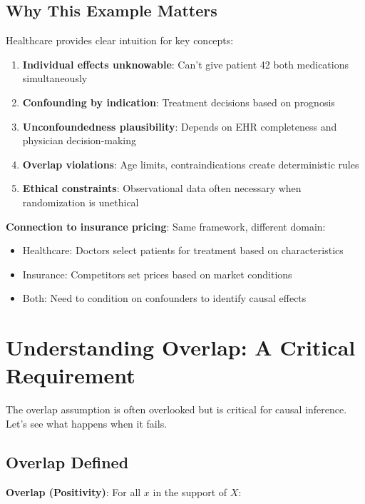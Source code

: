 \subsection{Why This Example Matters}\label{_why_this_example_matters}

Healthcare provides clear intuition for key concepts:

\begin{enumerate}
\def\labelenumi{\arabic{enumi}.}
\item
  \textbf{Individual effects unknowable}: Can't give patient 42 both
  medications simultaneously
\item
  \textbf{Confounding by indication}: Treatment decisions based on
  prognosis
\item
  \textbf{Unconfoundedness plausibility}: Depends on EHR completeness
  and physician decision-making
\item
  \textbf{Overlap violations}: Age limits, contraindications create
  deterministic rules
\item
  \textbf{Ethical constraints}: Observational data often necessary when
  randomization is unethical
\end{enumerate}

\textbf{Connection to insurance pricing}: Same framework, different domain:
\begin{itemize}
\item Healthcare: Doctors select patients for treatment based on characteristics
\item Insurance: Competitors set prices based on market conditions
\item Both: Need to condition on confounders to identify causal effects
\end{itemize}

\section{Understanding Overlap: A Critical
Requirement}\label{_understanding_overlap_a_critical_requirement}

The overlap assumption is often overlooked but is critical for causal
inference. Let's see what happens when it fails.

\subsection{Overlap Defined}\label{_overlap_defined}

\textbf{Overlap (Positivity)}: For all \(x\) in the support of \(X\):

